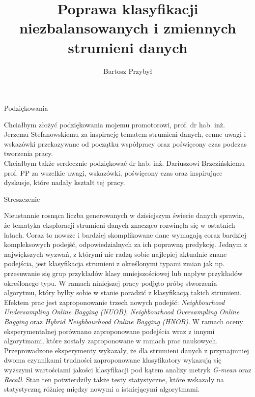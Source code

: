 \documentclass[polish,master,a4paper,oneside,11pt]{ppfcmthesis}
\author{%
   Bartosz Przybył \album{136785}}
\title{Poprawa klasyfikacji niezbalansowanych i zmiennych strumieni danych}
\begin{document}
\frontmatter\pagestyle{empty}%
\maketitle\cleardoublepage%

\newpage\null\thispagestyle{empty}\newpage
\begin{center}
    \huge Podziękowania
\end{center}
Chciałbym złożyć podziękowania mojemu promotorowi, prof. dr hab. inż. Jerzemu Stefanowskiemu za inspirację tematem strumieni danych, cenne uwagi i wskazówki przekazywane od początku współpracy oraz poświęcony czas podczas tworzenia pracy.\\

\noindent Chciałbym także serdecznie podziękować dr hab. inż. Dariuszowi Brzezińskiemu prof. PP za wszelkie uwagi, wskazówki, poświęcony czas oraz inspirujące dyskusje, które nadały kształt tej pracy.


\newpage\null\thispagestyle{empty}\newpage
\newpage
\begin{center}
    \huge Streszczenie
\end{center}
Nieustannie rosnąca liczba generowanych w dzisiejszym świecie danych sprawia, że tematyka eksploracji strumieni danych znacząco rozwinęła się w ostatnich latach. Coraz to nowsze i bardziej skomplikowane dane wymagają coraz bardziej kompleksowych podejść, odpowiedzialnych za ich poprawną predykcję. Jednym z największych wyzwań, z którymi nie radzą sobie najlepiej aktualnie znane podejścia, jest klasyfikacja strumieni z określonymi typami zmian jak np. przesuwanie się grup przykładów klasy mniejszościowej lub napływ przykładów określonego typu. W ramach niniejszej pracy podjęto próbę stworzenia algorytmu, który byłby sobie w stanie poradzić z klasyfikacją takich strumieni. Efektem prac jest zaproponowanie trzech nowych podejść: \textit{Neighbourhood Undersampling Online Bagging (NUOB)}, \textit{Neighbourhood Oversampling Online Bagging} oraz \textit{Hybrid Neighbourhood Online Bagging (HNOB)}. W ramach oceny eksperymentalnej porównano zaproponowane podejścia wraz z innymi algorytmami, które zostały zaproponowane w ramach prac naukowych. Przeprowadzone eksperymenty wykazały, że dla strumieni danych z przynajmniej dwoma czynnikami trudności zaproponowane klasyfikatory wykazują się wyższymi wartościami jakości klasyfikacji pod kątem analizy metryk \textit{G-mean} oraz \textit{Recall}. Stan ten potwierdziły także testy statystyczne, które wskazały na statystyczną różnicę między nowymi a istniejącymi algorytmami.\\\\
\end{document}
